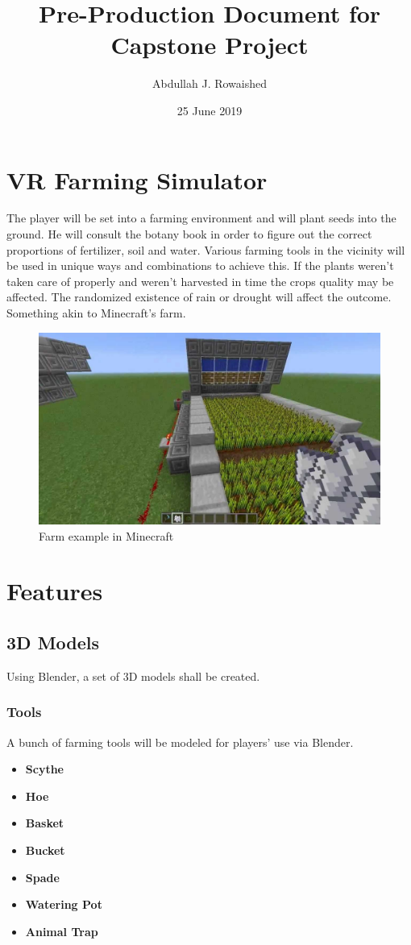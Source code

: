 \documentclass{article}
\title{Pre-Production Document for Capstone Project}
\author{Abdullah J. Rowaished}
\date{25 June 2019}
\begin{document}
\maketitle
\section{VR Farming Simulator}
The player will be set into a farming environment and will plant seeds into the ground. He will consult the botany book in order to figure out the correct proportions of fertilizer, soil and water. Various farming tools in the vicinity will be used in unique ways and combinations to achieve this. If the plants weren't taken care of properly and weren't harvested in time the crops quality may be affected. The randomized existence of rain or drought will affect the outcome. Something akin to Minecraft's farm.
\begin{figure}[h] %
\centering
\includegraphics[scale=0.25]{minecraft}
\caption{Farm example in Minecraft}
\end{figure} %

\section{Features}
\subsection{3D Models}
Using Blender, a set of 3D models shall be created.
\subsubsection{Tools}
A bunch of farming tools will be modeled for players' use via Blender.
\begin{itemize} %
\item \textbf{Scythe}
\item \textbf{Hoe}
\item \textbf{Basket}
\item \textbf{Bucket}
\item \textbf{Spade}
\item \textbf{Watering Pot}
\item \textbf{Animal Trap}
\end{itemize} %
\end{document}

